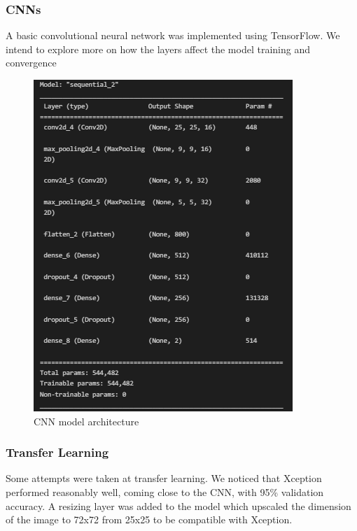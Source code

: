 \documentclass[10pt,twocolumn,letterpaper]{article}
\begin{document}
\subsubsection{CNNs}
A basic convolutional neural network was implemented using TensorFlow. We intend to explore more on how the layers affect the model training and convergence

\begin{figure}[t]
   \begin{center}
      \includegraphics[width=1\linewidth]{../Plots/model_specifications.png}
   \end{center}
      \caption{CNN model architecture}
   \label{fig:cnn_architecture}
\end{figure}

\subsubsection{Transfer Learning}
Some attempts were taken at transfer learning. We noticed that Xception performed reasonably well, coming close to the CNN, with 95\% validation accuracy. A resizing layer was added to the model which upscaled the dimension of the image to 72x72 from 25x25 to be compatible with Xception.
\end{document}
